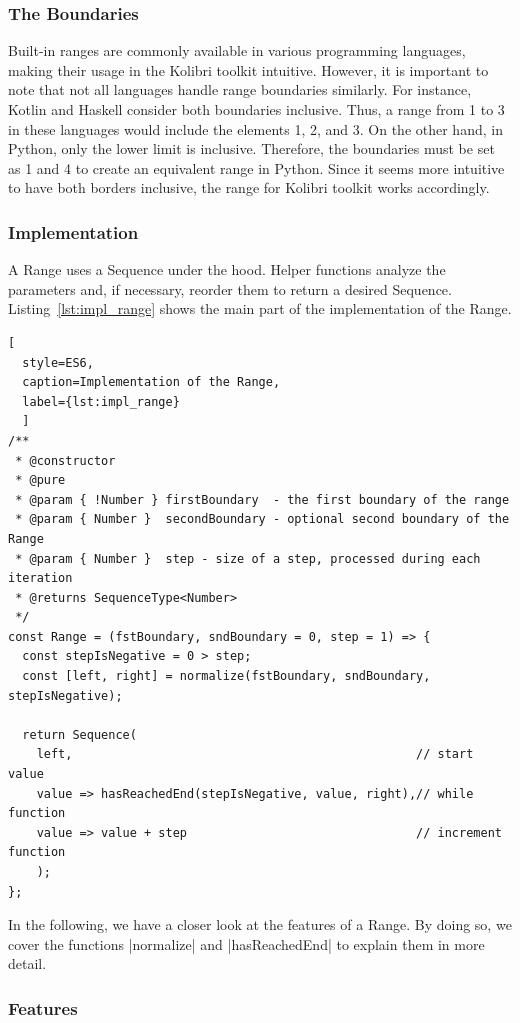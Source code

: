 \subsubsection{The Boundaries}
\label{subsub:The Boundaries}
Built-in ranges are commonly available in various programming languages, making
their usage in the Kolibri toolkit intuitive. However, it is important to note
that not all languages handle range boundaries similarly. For instance, Kotlin
and Haskell consider both boundaries inclusive. Thus, a range from 1 to 3 in
these languages would include the elements 1, 2, and 3. On the other hand, in
Python, only the lower limit is inclusive. Therefore, the boundaries must be
set as 1 and 4 to create an equivalent range in Python.
Since it seems more intuitive to have both borders inclusive, the range for
Kolibri toolkit works accordingly.

\subsubsection{Implementation}
\label{subsub:Implementation}
A Range uses a Sequence under the hood. Helper functions analyze the parameters
and, if necessary, reorder them to return a desired Sequence. Listing~\ref{lst:impl_range} shows the
main part of the implementation of the Range. 

\begin{lstlisting}[
  style=ES6, 
  caption=Implementation of the Range,
  label={lst:impl_range}
  ]
/**
 * @constructor
 * @pure
 * @param { !Number } firstBoundary  - the first boundary of the range
 * @param { Number }  secondBoundary - optional second boundary of the Range
 * @param { Number }  step - size of a step, processed during each iteration
 * @returns SequenceType<Number>
 */
const Range = (fstBoundary, sndBoundary = 0, step = 1) => {
  const stepIsNegative = 0 > step;
  const [left, right] = normalize(fstBoundary, sndBoundary, stepIsNegative);

  return Sequence(
    left,                                                // start value
    value => hasReachedEnd(stepIsNegative, value, right),// while function
    value => value + step                                // increment function
    );
};
\end{lstlisting}

In the following, we have a closer look at the features of a Range. By doing
so, we cover the functions |normalize| and |hasReachedEnd| to explain them 
in more detail.

\subsubsection{Features}
\label{subsub:Features}


